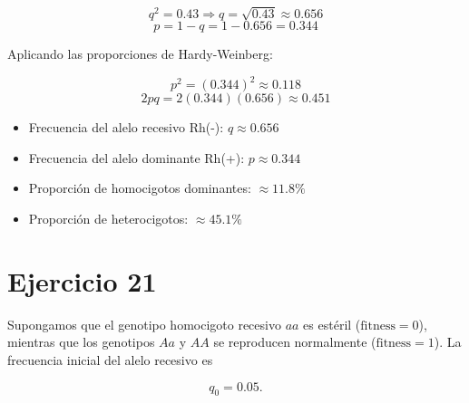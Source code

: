 \documentclass{article}
\begin{document}
\[
q^2 = 0.43 \Rightarrow q = \sqrt{0.43} \approx 0.656
\]
\[
p = 1 - q = 1 - 0.656 = 0.344
\]

Aplicando las proporciones de Hardy-Weinberg:

\[
p^2 = (0.344)^2 \approx 0.118
\]
\[
2pq = 2(0.344)(0.656) \approx 0.451
\]

\begin{itemize}
  \item Frecuencia del alelo recesivo Rh(-): \( q \approx 0.656 \)
  \item Frecuencia del alelo dominante Rh(+): \( p \approx 0.344 \)
  \item Proporción de homocigotos dominantes: \( \approx 11.8\% \)
  \item Proporción de heterocigotos: \( \approx 45.1\% \)
\end{itemize}


\section*{Ejercicio 21}

Supongamos que el genotipo homocigoto recesivo \(aa\) es estéril (\(\text{fitness}=0\)), mientras que los genotipos \(Aa\) y \(AA\) se reproducen normalmente (\(\text{fitness}=1\)).  
La frecuencia inicial del alelo recesivo es

\[
q_0 = 0.05 .
\]
\end{document}
